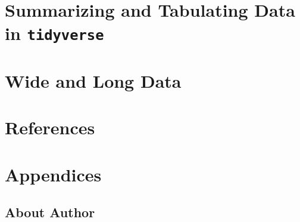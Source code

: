 \documentclass[
]{article}
\begin{document}
\hypertarget{summarizing-and-tabulating-data-in-tidyverse}{%
\section{\texorpdfstring{Summarizing and Tabulating Data in \texttt{tidyverse}}{Summarizing and Tabulating Data in tidyverse}}\label{summarizing-and-tabulating-data-in-tidyverse}}

\hypertarget{wide-and-long-data}{%
\section{Wide and Long Data}\label{wide-and-long-data}}

\hypertarget{references}{%
\section*{References}\label{references}}

\hypertarget{appendices}{%
\section*{Appendices}\label{appendices}}

\hypertarget{about-author}{%
\subsection*{About Author}\label{about-author}}
\end{document}
